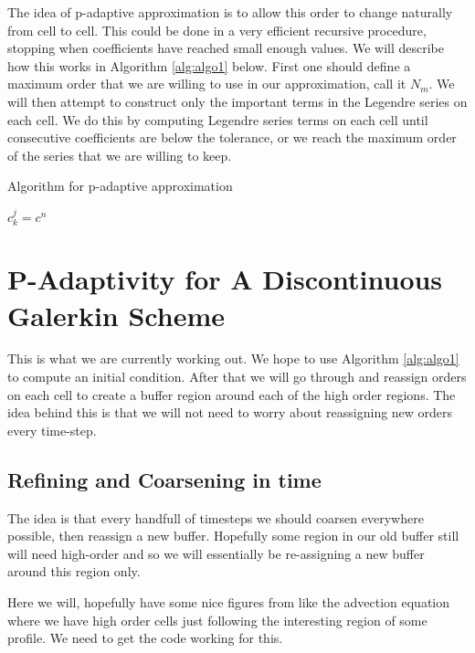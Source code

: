 \documentclass[10]{amsart}
\begin{document}
The idea of p-adaptive approximation is to allow this order to change naturally from cell to cell. This could be done in a 
very efficient recursive procedure, stopping when coefficients have reached small enough values. 
We will describe how this works in Algorithm \ref{alg:algo1} below.
First one should define a maximum order that we are willing to use in our approximation, call it $N_m$. We will
then attempt to construct only the important terms in the Legendre series on each cell. We do this by computing Legendre
series terms on each cell until consecutive coefficients are below the tolerance, or we reach the maximum order
of the series that we are willing to keep. 

\begin{algorithm}
\caption{Algorithm for p-adaptive approximation}
\begin{algorithmic}[1]
    \State $c^j_k=c^n$
  \EndWhile
\EndFor
\end{algorithmic}\label{alg:algo1}
\end{algorithm}

\section{P-Adaptivity for A Discontinuous Galerkin Scheme}

This is what we are currently working out. We hope to use Algorithm \ref{alg:algo1} to
compute an initial condition. After that we will go through and reassign orders on each cell
to create a buffer region around each of the high order regions. The idea behind this is that we 
will not need to worry about reassigning new orders every time-step. 

\subsection{Refining and Coarsening in time}

The idea is that every handfull of timesteps we should coarsen everywhere possible, then reassign a new buffer.
Hopefully some region in our old buffer still will need high-order and so we will essentially be re-assigning a new
buffer around this region only.

Here we will, hopefully have some nice figures from like the advection equation where we have high order cells just following
the interesting region of some profile. We need to get the code working for this.
\end{document}
